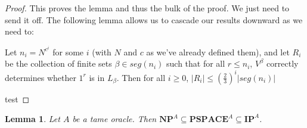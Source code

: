 \documentclass{article}
\theoremstyle{definition}
\theoremstyle{plain}
\theoremstyle{theorem}
\newtheorem{lemma}{Lemma}[section]
\begin{document}
\begin{proof}
	This proves the lemma and thus the bulk of the proof. We just need to send it off. The following lemma allows us to cascade our results downward as we need to: \par 
	\vspace{10mm}
		Let $n_i=N^{c^i}$ for some $i$ (with $N$ and $c$ as we've already defined them), and let $R_i$ be the collection of finite sets $\beta \in seg(n_i)$ such that for all $r \leq n_i$, $V^{\beta}$ correctly determines whether $1^r$ is in $L_{\beta}$. Then for all $i \geq 0$, $|R_i| \leq \left(\frac{2}{3}\right)^i|seg(n_i)|$
	\vspace{10mm}
	\par test
\end{proof}
\begin{lemma}
	Let $A$ be a tame oracle. Then $\bm{NP}^A \subseteq \bm{PSPACE}^A \subseteq \bm{IP}^A$. 
\end{lemma}
\end{document}
